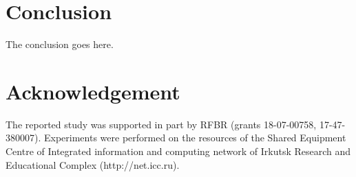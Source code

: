 \documentclass[conference,a4paper]{IEEEtran}
\begin{document}
%






\section{Conclusion}
The conclusion goes here.






\section*{Acknowledgement}
The reported study was supported in part by RFBR (grants 18-07-00758, 17-47-380007). Experiments were performed on the resources of the Shared Equipment Centre of Integrated information and computing network of Irkutsk Research and Educational Complex (http://net.icc.ru).
\end{document}
